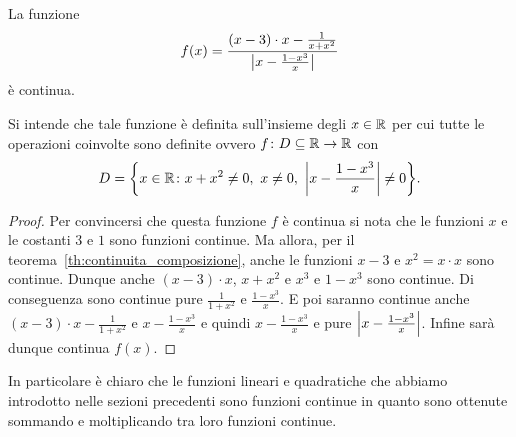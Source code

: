   \begin{example}
  La funzione
  \[
  f(x) = \frac{(x-3)\cdot x -\frac{1}{x+x^2}}{{\left|x-\frac{1-x^3}{x}\right|}}
  \]
  è continua.
  
  Si intende che tale funzione è definita sull'insieme degli $x\in {\mathbb R}$
  per cui tutte le operazioni coinvolte sono definite ovvero
  $f\colon D \subseteq {\mathbb R} \to {\mathbb R}$
  con
  \[
    D = \ENCLOSE{x\in \RR \colon x+x^2 \neq 0,\ x\neq 0,\ \abs{x-\frac{1-x^3}{x}}\neq 0}.
  \]
  \end{example}
  \begin{proof}
  Per convincersi che questa funzione $f$ è continua
  si nota che le funzioni $x$ e le costanti $3$ e $1$ sono
  funzioni continue.
  Ma allora, per il teorema~\ref{th:continuita_composizione},
  anche le funzioni $x-3$ e $x^2=x\cdot x$ sono continue.
  Dunque anche $(x-3)\cdot x$, $x+x^2$ e $x^3$ e $1-x^3$ sono continue.
  Di conseguenza sono continue pure $\frac 1{1+x^2}$ e $\frac{1-x^3}{x}$.
  E poi saranno continue anche $(x-3)\cdot x - \frac 1{1+x^2}$ e $x-\frac{1-x^3}{x}$
  e quindi $x-\frac{1-x^3}{x}$ e pure ${\left|x-\frac{1-x^3}{x}\right|}$. Infine sarà
  dunque continua $f(x)$.
  \end{proof}
  
  In particolare è chiaro che le funzioni lineari e quadratiche 
  che abbiamo introdotto nelle sezioni precedenti sono funzioni continue
  in quanto sono ottenute sommando e moltiplicando tra loro funzioni continue.
  
  
